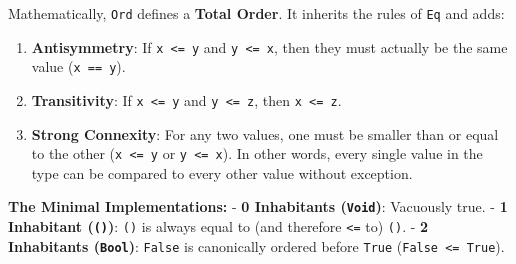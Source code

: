 \documentclass[
]{article}
\providecommand{\tightlist}{%
  \setlength{\itemsep}{0pt}\setlength{\parskip}{0pt}}
\begin{document}
Mathematically, \texttt{Ord} defines a \textbf{Total Order}. It inherits
the rules of \texttt{Eq} and adds:

\begin{enumerate}
\def\labelenumi{\arabic{enumi}.}
\tightlist
\item
  \textbf{Antisymmetry}: If \texttt{x\ \textless{}=\ y} and
  \texttt{y\ \textless{}=\ x}, then they must actually be the same value
  (\texttt{x\ ==\ y}).
\item
  \textbf{Transitivity}: If \texttt{x\ \textless{}=\ y} and
  \texttt{y\ \textless{}=\ z}, then \texttt{x\ \textless{}=\ z}.
\item
  \textbf{Strong Connexity}: For any two values, one must be smaller
  than or equal to the other (\texttt{x\ \textless{}=\ y} or
  \texttt{y\ \textless{}=\ x}). In other words, every single value in
  the type can be compared to every other value without exception.
\end{enumerate}

\textbf{The Minimal Implementations:} - \textbf{0 Inhabitants
(\texttt{Void})}: Vacuously true. - \textbf{1 Inhabitant (\texttt{()})}:
\texttt{()} is always equal to (and therefore \texttt{\textless{}=} to)
\texttt{()}. - \textbf{2 Inhabitants (\texttt{Bool})}: \texttt{False} is
canonically ordered before \texttt{True}
(\texttt{False\ \textless{}=\ True}).
\end{document}
